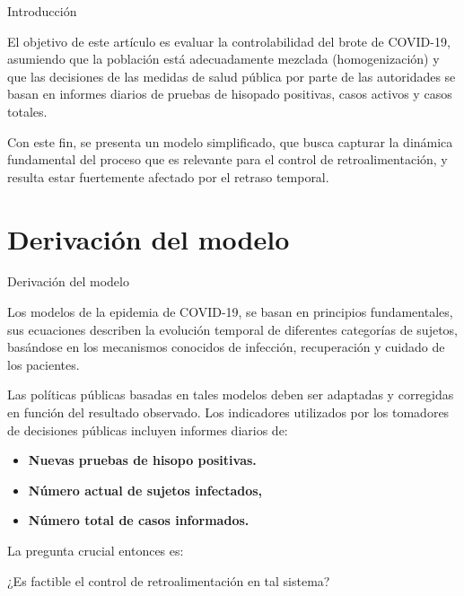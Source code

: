 \documentclass{beamer}
\begin{document}
\begin{frame}{Introducción}
\begin{justify}

El objetivo de este artículo es evaluar la controlabilidad del brote de COVID-19, asumiendo que la población está adecuadamente mezclada (homogenización) y que las decisiones de las medidas de salud pública por parte de las autoridades se basan en informes diarios de pruebas de hisopado positivas, casos activos y casos totales. 

\vspace{0.3cm}
Con este fin, se presenta un modelo simplificado, que busca capturar la dinámica fundamental del proceso que es relevante para el control de retroalimentación, y resulta estar fuertemente afectado por el retraso temporal.

\end{justify}
\end{frame}

\section{Derivación del modelo}
\begin{frame}{Derivación del modelo}
\begin{justify}
{\footnotesize

Los modelos de la epidemia de COVID-19, se basan en principios fundamentales, sus ecuaciones describen la evolución temporal de diferentes categorías de sujetos, basándose en los mecanismos conocidos de infección, recuperación y cuidado de los pacientes. 

\vspace{0.2 cm}
Las políticas públicas basadas en tales modelos deben ser adaptadas y corregidas en función del resultado observado. Los indicadores utilizados por los tomadores de decisiones públicas incluyen informes diarios de: 

\begin{itemize}
 
 \vspace{0.3 cm}
    \item\textbf{Nuevas pruebas de hisopo positivas.} 

 \vspace{0.1 cm}
    \item\textbf{Número actual de sujetos infectados,} 

 \vspace{0.1 cm}
    \item\textbf{Número total de casos informados.} 

\end{itemize}

\vspace{0.3cm}
La pregunta crucial entonces es: 

\vspace{0.3cm}
¿Es factible el control de retroalimentación en tal sistema?


}

\end{justify}
\end{frame}
\end{document}
